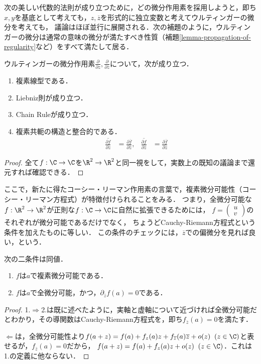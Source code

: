 \documentclass[uplatex, dvipdfmx]{jsreport}
\begin{document}
次の美しい代数的法則が成り立つために，どの微分作用素を採用しようと，即ち$x,y$を基底として考えても，$z,\overline{z}$を形式的に独立変数と考えてウルティンガーの微分を考えても，
議論はほぼ並行に展開される．次の補題のように，ウルティンガーの微分は通常の意味の微分が満たすべき性質（補題\ref{lemma-propagation-of-regularity}など）をすべて満たして居る．
\begin{lemma}[微分法則]\label{lemma-Wirtinger-operator}
    ウルティンガーの微分作用素$\frac{\partial}{\partial z},\frac{\partial}{\partial\overline{z}}$について，次が成り立つ．
    \begin{enumerate}
        \item 複素線型である．
        \item Liebniz則が成り立つ．
        \item Chain Ruleが成り立つ．
        \item 複素共軛の構造と整合的である．
        \begin{align*}
            \overline{\frac{\partial f}{\partial z}}&=\frac{\partial \overline{f}}{\partial\overline{z}},&\overline{\frac{\partial f}{\partial \overline{z}}}&=\frac{\partial \overline{f}}{\partial z}
        \end{align*}
    \end{enumerate}
\end{lemma}
\begin{proof}
    全て$f:\C\to\C$を$\R^2\to\R^2$と同一視をして，実数上の既知の議論まで還元すれば確認できる．
\end{proof}

ここで，新たに得たコーシー・リーマン作用素の言葉で，複素微分可能性（コーシー・リーマン方程式）が特徴付けられることをみる．
つまり，全微分可能な$f:\R^2\to\R^2$が正則な$f:\C\to\C$に自然に拡張できるためには，
$f=\begin{pmatrix}u\\v\end{pmatrix}$のそれぞれが微分可能であるだけでなく，
ちょうどCauchy-Riemann方程式という条件を加えたものに等しい．
この条件のチェックには，$\overline{z}$での偏微分を見れば良い，という．

\begin{theorem}[複素微分可能性の特徴付け]\label{thm-charactorization-of-complex-differentialability}
    次の二条件は同値．
    \begin{enumerate}
        \item $f$は$a$で複素微分可能である．
        \item $f$は$a$で全微分可能，かつ，$\partial_{\overline{z}}f(a)=0$である．
    \end{enumerate}
\end{theorem}
\begin{proof}
    1.$\Rightarrow$2.は既に述べたように，実軸と虚軸について近づければ全微分可能だとわかり，その導関数はCauchy-Riemann方程式を，即ち$f_{\overline{z}}(a)=0$を満たす．
    
    $\Leftarrow$は，全微分可能性より$f(a+z)=f(a)+f_z(a)z+f_{\overline{z}}(a)\overline{z}+o(z)\;\;(z\in\C)$と表せるが，$f_{\overline{z}}(a)=0$だから，
    $f(a+z)=f(a)+f_z(a)z+o(z)\;\;(z\in\C)$．これは1.の定義に他ならない．
\end{proof}
\end{document}
